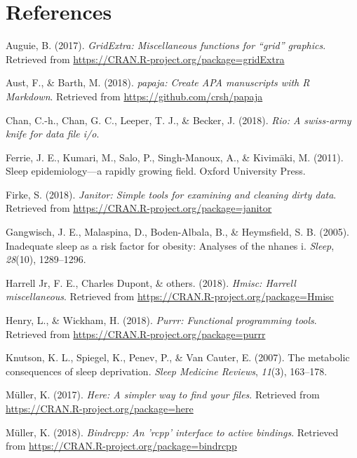 \documentclass[man, noextraspace]{apa6}
\theoremstyle{definition}
\theoremstyle{definition}
\theoremstyle{definition}
\theoremstyle{remark}
\begin{document}
\section{References}\label{references}

\begingroup
\setlength{\parindent}{-0.5in} \setlength{\leftskip}{0.5in}

\hypertarget{refs}{}
\hypertarget{ref-R-gridExtra}{}
Auguie, B. (2017). \emph{GridExtra: Miscellaneous functions for ``grid''
graphics}. Retrieved from
\url{https://CRAN.R-project.org/package=gridExtra}

\hypertarget{ref-R-papaja}{}
Aust, F., \& Barth, M. (2018). \emph{papaja: Create APA manuscripts with
R Markdown}. Retrieved from \url{https://github.com/crsh/papaja}

\hypertarget{ref-R-rio}{}
Chan, C.-h., Chan, G. C., Leeper, T. J., \& Becker, J. (2018).
\emph{Rio: A swiss-army knife for data file i/o}.

\hypertarget{ref-ferrie2011sleep}{}
Ferrie, J. E., Kumari, M., Salo, P., Singh-Manoux, A., \& Kivimäki, M.
(2011). Sleep epidemiology---a rapidly growing field. Oxford University
Press.

\hypertarget{ref-R-janitor}{}
Firke, S. (2018). \emph{Janitor: Simple tools for examining and cleaning
dirty data}. Retrieved from
\url{https://CRAN.R-project.org/package=janitor}

\hypertarget{ref-gangwisch2005inadequate}{}
Gangwisch, J. E., Malaspina, D., Boden-Albala, B., \& Heymsfield, S. B.
(2005). Inadequate sleep as a risk factor for obesity: Analyses of the
nhanes i. \emph{Sleep}, \emph{28}(10), 1289--1296.

\hypertarget{ref-R-Hmisc}{}
Harrell Jr, F. E., Charles Dupont, \& others. (2018). \emph{Hmisc:
Harrell miscellaneous}. Retrieved from
\url{https://CRAN.R-project.org/package=Hmisc}

\hypertarget{ref-R-purrr}{}
Henry, L., \& Wickham, H. (2018). \emph{Purrr: Functional programming
tools}. Retrieved from \url{https://CRAN.R-project.org/package=purrr}

\hypertarget{ref-knutson2007metabolic}{}
Knutson, K. L., Spiegel, K., Penev, P., \& Van Cauter, E. (2007). The
metabolic consequences of sleep deprivation. \emph{Sleep Medicine
Reviews}, \emph{11}(3), 163--178.

\hypertarget{ref-R-here}{}
Müller, K. (2017). \emph{Here: A simpler way to find your files}.
Retrieved from \url{https://CRAN.R-project.org/package=here}

\hypertarget{ref-R-bindrcpp}{}
Müller, K. (2018). \emph{Bindrcpp: An 'rcpp' interface to active
bindings}. Retrieved from
\url{https://CRAN.R-project.org/package=bindrcpp}
\end{document}

